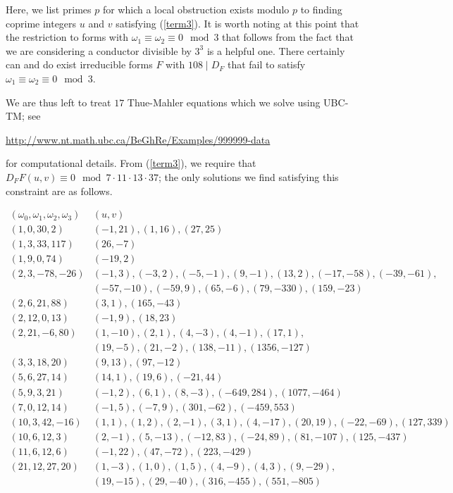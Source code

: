 Here, we list primes $p$ for which a local obstruction exists modulo $p$ to finding coprime integers  $u$ and $v$ satisfying (\ref{term3}). 
It is worth noting at this point that the restriction to forms with $\omega_1 \equiv \omega_2 \equiv 0 \mod{3}$ that follows from the fact that we are considering a conductor divisible by $3^3$ is a helpful one. There certainly can and do exist irreducible forms $F$ with $108 \mid D_F$ that fail to satisfy $\omega_1 \equiv \omega_2 \equiv 0 \mod{3}$.

We are thus left to treat $17$ Thue-Mahler equations which we solve using UBC-TM; see 
\begin{center}
\url{http://www.nt.math.ubc.ca/BeGhRe/Examples/999999-data}
\end{center}
 for computational details. From (\ref{term3}), we require that
$D_F F(u,v) \equiv 0 \mod{7 \cdot 11 \cdot 13 \cdot 37}$; the only solutions we find satisfying this constraint are as follows.

$$
\begin{array}{c|c} 
(\omega_0,\omega_1,\omega_2,\omega_3) & (u,v) \\ \hline
(1, 0, 30, 2) & (-1,21), (1,16), (27,25) \\
(1,3,33,117) & (26,-7) \\
(1,9,0,74) &  (-19,2) \\
(2,3,-78,-26) & (-1,3), (-3,2), (-5,-1), (9,-1), (13,2), (-17,-58), (-39,-61), \\
&   (-57,-10), (-59,9), (65,-6), (79,-330), (159,-23) \\
(2,6,21,88) & (3,1), (165,-43) \\
(2,12,0,13) & (-1,9), (18,23) \\
(2,21,-6,80) & (1, -10), (2,1), (4, -3), (4,-1), (17, 1),\\
& 	(19, -5),(21, -2 ),(138, -11 ),(1356, -127) \\
(3,3,18,20) & (9,13), (97,-12) \\
(5,6,27,14) & (14,1),  (19,6),  (-21,44) \\
(5,9,3,21) & (-1,2), (6,1), (8,-3), (-649,284), (1077,-464)  \\
(7,0,12,14) & (-1,5), (-7,9), (301,-62), (-459,553)  \\
(10,3,42,-16) & (1,1), (1,2), (2,-1), (3,1), (4,-17), (20,19), (-22,-69),  (127,339)  \\
(10,6,12,3) & (2,-1), (5,-13), (-12,83), (-24,89), (81,-107), (125,-437) \\
(11,6,12,6) & (-1,22), (47,-72), (223,-429) \\
(21,12,27,20) & (1, -3 ),(1, 0 ),(1, 5 ),(4, -9),(4, 3 ),(9, -29 ),\\
& 	(19, -15 ),(29, -40 ),(316, -455 ),(551, -805)\\
\end{array}
$$ 


